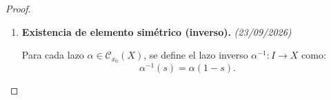 \begin{proof}
\begin{enumerate}
    Sea $c_{x_0} : I \to X$ el lazo constante $c_{x_0}(s) = x_0$ para todo $s \in I$. Se debe probar que:
    \[
    [c_{x_0}] \cdot [\alpha] = [\alpha] \iff c_{x_0} * \alpha \simeq_{\{0,1\}} \alpha.
    \]
    El producto con el neutro es:
    \[
    (c_{x_0} * \alpha)(s) = 
    \begin{cases}
    c_{x_0}(2s) = x_0 & \text{si } s \in [0, 1/2], \\
    \alpha(2s - 1) & \text{si } s \in [1/2, 1].
    \end{cases}
    \]
    Se construye la homotopía $F : I \times I \to X$:
    \[
    F(s, t) = 
    \begin{cases}
    x_0 & \text{si } s \in \left[0, \dfrac{1-t}{2}\right], \\[2ex]
    \alpha\left( \dfrac{2s + t - 1}{t + 1} \right) & \text{si } s \in \left[\dfrac{1-t}{2}, 1\right].
    \end{cases}
    \]
    \begin{itemize}
        \item En $s = \frac{1-t}{2}$, $\alpha\left( \frac{2\frac{1-t}{2} + t - 1}{t+1} \right) = \alpha(0) = x_0$, coincidiendo con el valor constante.
        \item $F(s, 0) = (c_{x_0} * \alpha)(s)$ y $F(s, 1) = \alpha(s)$.
        \item $F(0, t) = x_0$ y $F(1, t) = \alpha(1) = x_0$ para todo $t \in I$.
    \end{itemize}
    Análogamente se comprueba para $[\alpha] \cdot [c_{x_0}] = [\alpha]$.

    \item \textbf{Existencia de elemento simétrico (inverso).} \hfill \textit{(23/09/2026)}
    
    Para cada lazo $\alpha \in \mathcal{C}_{x_0}(X)$, se define el lazo inverso $\alpha^{-1} : I \to X$ como:
    \[
    \alpha^{-1}(s) = \alpha(1 - s).
    \]
    

\end{enumerate}
\end{proof}
